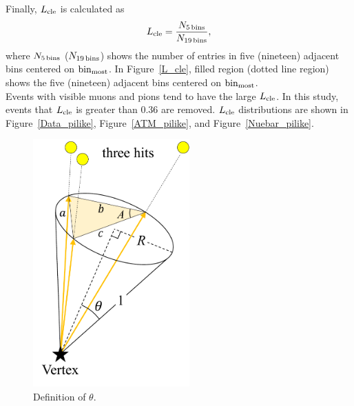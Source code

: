 Finally, $L_{\rm cle}$ is calculated as
\begin{eqnarray}
	L_{\rm cle} = {N_{5\,{\rm bins}} \over N_{19\,{\rm bins}}},
\end{eqnarray}
where $N_{5\,{\rm bins}}$ ($N_{19\,{\rm bins}}$) shows the number of entries in five (nineteen) adjacent bins centered on ${\rm bin}_{\rm most}$.
In Figure~\ref{L_cle}, filled region (dotted line region) shows the five (nineteen) adjacent bins centered on ${\rm bin}_{\rm most}$.\\
\hs
Events with visible muons and pions tend to have the large $L_{\rm cle}$.
In this study, events that $L_{\rm cle}$ is greater than 0.36 are removed.
$L_{\rm cle}$ distributions are shown in Figure~\ref{Data_pilike}, Figure~\ref{ATM_pilike}, and Figure~\ref{Nuebar_pilike}.

\begin{figure}[p]
	\centering
	\includegraphics[width=6cm]{Figures/Selection/opening_angle}
	\caption[Definition of $\theta$]{
	Definition of $\theta$.
	}\label{opening_angle}
\end{figure}

